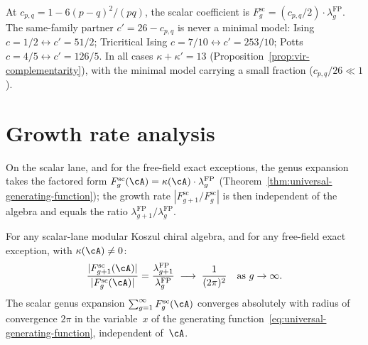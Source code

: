 \begin{remark}

\label{rem:minimal-model-genera}
At $c_{p,q} = 1 - 6(p-q)^2/(pq)$, the scalar coefficient is
$F_g^{\mathrm{sc}} = (c_{p,q}/2) \cdot \lambda_g^{\mathrm{FP}}$.
The same-family partner $c' = 26 - c_{p,q}$ is never a minimal model:
Ising $c=1/2 \leftrightarrow c'=51/2$; Tricritical Ising
$c=7/10 \leftrightarrow c'=253/10$; Potts
$c=4/5 \leftrightarrow c'=126/5$. In all cases
$\kappa + \kappa' = 13$ (Proposition~\ref{prop:vir-complementarity}),
with the minimal model carrying a small fraction
($c_{p,q}/26 \ll 1$).
\end{remark}


\section{Growth rate analysis}\label{sec:growth-rate-genera}

On the scalar lane, and for the free-field exact exceptions,
the genus expansion takes the factored form
$F_g^{\mathrm{sc}}(\cA)
=\kappa(\cA) \cdot \lambda_g^{\mathrm{FP}}$
(Theorem~\ref{thm:universal-generating-function}); the
growth rate $|F^{\mathrm{sc}}_{g+1}/F^{\mathrm{sc}}_g|$ is then independent of the algebra
and equals the ratio
$\lambda_{g+1}^{\mathrm{FP}}/\lambda_g^{\mathrm{FP}}$.

\begin{proposition}\label{prop:universal-growth-rate}

For any scalar-lane modular Koszul chiral algebra, and for any
free-field exact exception, with $\kappa(\cA)\neq 0$:
\begin{equation}\label{eq:universal-growth-rate}
\frac{|F^{\mathrm{sc}}_{g+1}(\cA)|}{|F^{\mathrm{sc}}_g(\cA)|}
= \frac{\lambda_{g+1}^{\mathrm{FP}}}
{\lambda_g^{\mathrm{FP}}}
\;\longrightarrow\; \frac{1}{(2\pi)^2}
\quad \text{as } g \to \infty.
\end{equation}
The scalar genus expansion $\sum_{g=1}^\infty F_g^{\mathrm{sc}}(\cA)$
converges absolutely with radius of convergence $2\pi$
in the variable~$x$ of the generating function~\eqref{eq:universal-generating-function}, independent
of~$\cA$.
\end{proposition}

